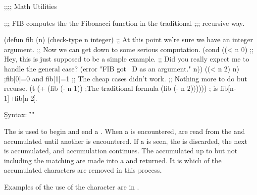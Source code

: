 \endsubsubsubsection%


\code
;;;; Math Utilities

;;; FIB computes the the Fibonacci function in the traditional
;;; recursive way.

(defun fib (n)
  (check-type n integer)
  ;; At this point we're sure we have an integer argument.
  ;; Now we can get down to some serious computation.
  (cond ((< n 0)
         ;; Hey, this is just supposed to be a simple example.
         ;; Did you really expect me to handle the general case?
         (error "FIB got ~D as an argument." n))
        ((< n 2) n)             ;fib[0]=0 and fib[1]=1
        ;; The cheap cases didn't work.
        ;; Nothing more to do but recurse.
        (t (+ (fib (- n 1))     ;The traditional formula
              (fib (- n 2)))))) ; is fib[n-1]+fib[n-2].
\endcode

\endsubsubsubsection%

\endsubsubsection%

\endsubsection%


\b{Syntax:} \f{""}


The  is used to begin and end a .
When a  is encountered,
 are read from the   
and accumulated until another  is encountered.
If a   is seen,
the   is discarded,
the next  is accumulated, and accumulation continues.
The accumulated  
up to but not including the matching  
are made into a  and returned.
It is 
which  of the accumulated characters are removed in this process.

Examples of the use of the  character are in \thenextfigure. 



